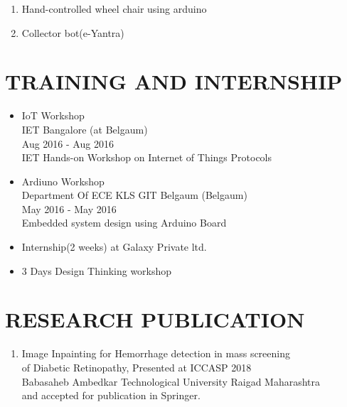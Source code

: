 \documentclass[paper=a4,fontsize=11pt]{scrartcl}
\newcommand{\NewPart}[1]{\section*{\uppercase{#1}}}
\begin{document}
\begin{enumerate}
  \item Hand-controlled wheel chair using arduino
  \item Collector bot(e-Yantra)
\end{enumerate}
\newpage
\NewPart{Training and Internship}
\begin{itemize}
  \item IoT Workshop\\
IET Bangalore (at Belgaum)\\
Aug 2016 - Aug 2016\\
IET Hands-on Workshop on Internet of Things Protocols
  \item Ardiuno Workshop\\
Department Of ECE KLS GIT Belgaum (Belgaum)\\
May 2016 - May 2016\\
Embedded system design using Arduino Board
  \item Internship(2 weeks) at Galaxy Private ltd.
\item 3 Days Design Thinking workshop
\end{itemize}
\NewPart{Research Publication}

\begin{enumerate}
\item
Image Inpainting for Hemorrhage detection in mass screening \\of Diabetic Retinopathy, Presented at ICCASP 2018 \\
 Babasaheb Ambedkar
Technological University Raigad Maharashtra\\ and accepted for publication in Springer.
\end{enumerate}
\end{document}
